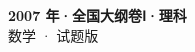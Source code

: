 \documentclass[zihao=-4, a4paper]{ctexart}
\begin{document}
\begin{center}
  {\Large\bfseries 2007 年·全国大纲卷Ⅰ·理科}\\[4pt]
  {\large 数学 · 试题版}
\end{center}
\medskip
{}

\end{document}
